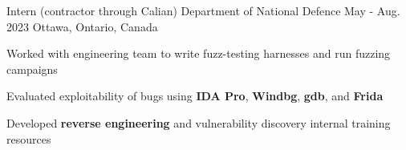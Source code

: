 

\begin{cventries}

  \cventry
    {Intern (contractor through Calian)} %
    {Department of National Defence} %
    {May - Aug. 2023} %
    {Ottawa, Ontario, Canada} %
    {
      \begin{cvitems} %
        \item{Worked with engineering team to write fuzz-testing harnesses and run fuzzing campaigns}
        \item{Evaluated exploitability of bugs using \textbf{IDA Pro}, \textbf{Windbg}, \textbf{gdb}, and \textbf{Frida}}
        \item{Developed \textbf{reverse engineering} and vulnerability discovery internal training resources}
      \end{cvitems}
    }


\end{cventries}
